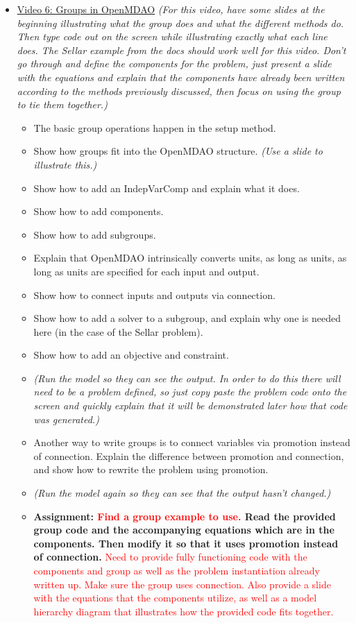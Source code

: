 \documentclass[12pt, letterpaper]{article}
\begin{document}
\begin{itemize}
	\item \underline{Video 6: Groups in OpenMDAO} \textit{(For this video, have some slides at the beginning illustrating what the group does 			and what the different methods do. Then type code out on the screen while illustrating exactly what each line does. The Sellar example from the 			docs should work well for this video. Don’t go through and define the components for the problem, just present a slide with the equations and 				explain that the components have already been written according to the methods previously discussed, then focus on using the group to tie them 		together.)}
		\begin{itemize}
			\item The basic group operations happen in the setup method.
			\item Show how groups fit into the OpenMDAO structure. \textit{(Use a slide to illustrate this.)}
			\item Show how to add an IndepVarComp and explain what it does.
			\item Show how to add components.
			\item Show how to add subgroups.
			\item Explain that OpenMDAO intrinsically converts units, as long as units, as long as units are specified for each input and output.
			\item Show how to connect inputs and outputs via connection.
			\item Show how to add a solver to a subgroup, and explain why one is needed here (in the case of the Sellar problem).
			\item Show how to add an objective and constraint.
			\item \textit{(Run the model so they can see the output. In order to do this there will need to be a problem defined, so just copy paste the 				problem code onto the screen and quickly explain that it will be demonstrated later how that code was generated.)}
			\item Another way to write groups is to connect variables via promotion instead of connection. Explain the difference between promotion 					and connection, and show how to rewrite the problem using promotion.
			\item \textit{(Run the model again so they can see that the output hasn’t changed.)}
			\item \textbf{Assignment: \textcolor{red}{Find a group example to use.} Read the provided group code and the accompanying equations which are in the components. Then modify it so that it uses promotion instead of connection.} \textcolor{red}{Need to provide fully functioning code with the components and group as well as the problem instantiation already written up. Make sure the group uses connection. Also provide a slide with the equations that the components utilize, as well as a model hierarchy diagram that illustrates how the provided code fits together.}
		\end{itemize}
		

\end{itemize}
\end{document}

